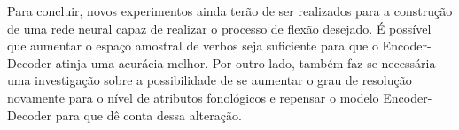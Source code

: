 Para concluir, novos experimentos ainda terão de ser realizados para a construção de uma rede neural capaz de realizar o processo de flexão desejado. É possível que aumentar o espaço amostral de verbos seja suficiente para que o Encoder-Decoder atinja uma acurácia melhor. Por outro lado, também faz-se necessária uma investigação sobre a possibilidade de se aumentar o grau de resolução novamente para o nível de atributos fonológicos e repensar o modelo Encoder-Decoder para que dê conta dessa alteração.

